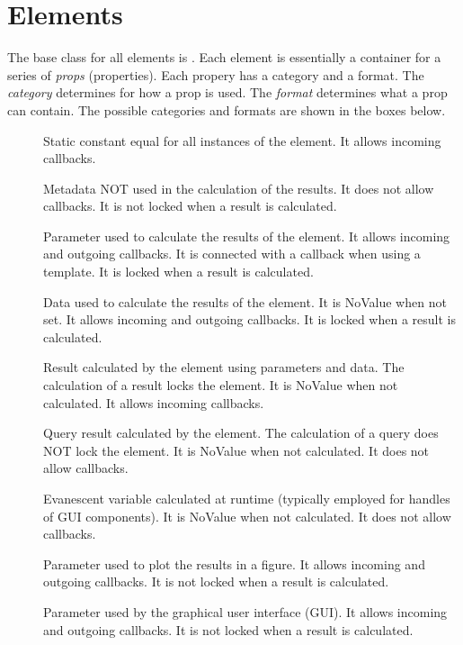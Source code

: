 \documentclass{tufte-handout}
\begin{document}
\section{Elements}

The base class for all elements is . 
Each element is essentially a container for a series of \emph{props} (properties). Each propery has a category and a format.
The \emph{category} determines for how a prop is used.
The \emph{format} determines what a prop can contain.
The possible categories and formats are shown in the boxes below.

\begin{fullwidth}
\begin{tcolorbox}[
	title=Property Categories
]
\begin{description} 
 	\item[] Static constant equal for all instances of the element. It allows incoming callbacks.
 
 	\item[] Metadata NOT used in the calculation of the results. It does not allow callbacks. It is not locked when a result is calculated.
 
 	\item[] Parameter used to calculate the results of the element. It allows incoming and outgoing callbacks. It is connected with a callback when using a template. It is locked when a result is calculated.
 
 	\item[] Data used to calculate the results of the element. It is NoValue when not set. It allows incoming and outgoing callbacks. It is locked when a result is calculated.
 
 	\item[] Result calculated by the element using parameters and data. The calculation of a result locks the element. It is NoValue when not calculated. It allows incoming callbacks.
 
 	\item[] Query result calculated by the element. The calculation of a query does NOT lock the element. It is NoValue when not calculated. It does not allow callbacks.
 
 	\item[] Evanescent variable calculated at runtime (typically employed for handles of GUI components). It is NoValue when not calculated. It does not allow callbacks.
 
 	\item[] Parameter used to plot the results in a figure. It allows incoming and outgoing callbacks. It is not locked when a result is calculated.
                
 	\item[] Parameter used by the graphical user interface (GUI). It allows incoming and outgoing callbacks. It is not locked when a result is calculated.
\end{description}
\end{tcolorbox}
\end{fullwidth}
\end{document}
